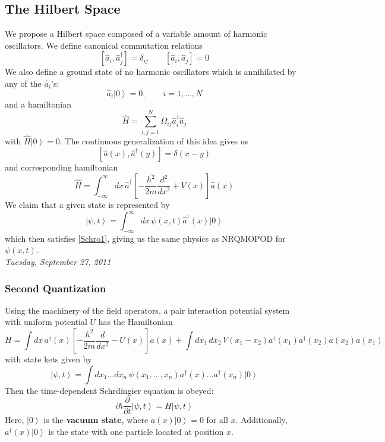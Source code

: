 \documentclass[10pt]{article}
\newcommand{\n}{\noindent}
\newcommand{\ket}[1]{\left|#1\right>}
\begin{document}
	\subsection{The Hilbert Space} 
	We propose a Hilbert space composed of a variable amount of harmonic oscillators. We define canonical commutation relations
	\begin{equation}\label{ccrs1} \left[\hat{a}_i,\hat{a}^\dag_j\right]=\delta_{ij} \qquad \left[\hat{a}_i, \hat{a}_j\right] = 0\end{equation}
	We also define a ground state of no harmonic oscillators which is annihilated by any of the $\hat{a}_i$'s:
	\begin{equation}\label{ground1} \hat{a}_i\ket{0} = 0,\qquad i=1,\ldots,N\end{equation}
	and a hamiltonian
	\begin{equation}\label{ham1} \hat{H} = \sum_{i,j=1}^N \Omega_{ij}\hat{a}^\dag_i\hat{a}_j\end{equation}
	with $\hat{H}\ket{0} = 0$. The continuous generalization of this idea gives us
	\begin{equation}\label{ccrs2} \left[\hat{a}(x), \hat{a}^\dag(y)\right] = \delta(x-y)\end{equation}
	and corresponding hamiltonian
	\begin{equation}\label{ham2} \hat{H} = \int_{-\infty}^\infty dx\,\hat{a}^\dag \left[-\frac{\hbar^2}{2m} \frac{d^2}{dx^2} + V(x)\right]\hat{a}(x)\end{equation}
	We claim that a given state is represented by
	\begin{equation} \label{state} \ket{\psi,t} = \int_{-\infty}^\infty dx\,\psi(x,t)\hat{a}^\dag(x)\ket{0}\end{equation}
	which then satisfies \eqref{Schro1}, giving us the same physics as NRQMOPOD for $\psi(x,t)$.\\
	
	\n\emph{Tuesday, September 27, 2011}
	\subsubsection{Second Quantization}
	Using the machinery of the field operators, a pair interaction potential system with uniform potential $U$ has the Hamiltonian
	\begin{equation} \label{secondquant1} H=\int dx\, a^\dag(x)\left[-\frac{\hbar^2}{2m}\frac{d}{dx^2}-U(x)\right]a(x)+\int dx_1\,dx_2\, V(x_1-x_2)a^\dag(x_1)a^\dag(x_2)a(x_2)a(x_1)\end{equation}
	with state kets given by
	\begin{equation}\label{secondquant2} \ket{\psi,t} =\int dx_1\ldots dx_n\,\psi(x_1,\ldots,x_n)a^\dag(x)\ldots a^\dag(x_n)\ket{0}\end{equation}
	Then the time-dependent Schr\"dingier equation is obeyed:
	\begin{equation} \label{secondquant3} i\hbar \frac{\partial}{\partial t}\ket{\psi,t}=H\ket{\psi,t}\end{equation}
	Here, $\ket{0}$ is the \textbf{vacuum state}, where $a(x)\ket{0}=0$ for all $x$. Additionally, $a^\dag(x)\ket{0}$ is the state with one particle located at position $x$.
\end{document}
